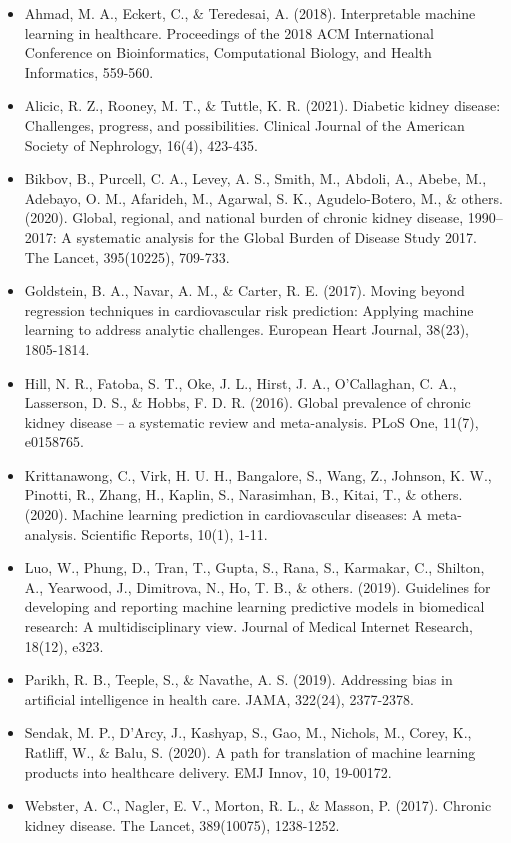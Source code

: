 \documentclass{article}
\begin{document}
\begin{itemize}
    \item Ahmad, M. A., Eckert, C., \& Teredesai, A. (2018). Interpretable machine learning in healthcare. Proceedings of the 2018 ACM International Conference on Bioinformatics, Computational Biology, and Health Informatics, 559-560.
    \item Alicic, R. Z., Rooney, M. T., \& Tuttle, K. R. (2021). Diabetic kidney disease: Challenges, progress, and possibilities. Clinical Journal of the American Society of Nephrology, 16(4), 423-435.
    \item Bikbov, B., Purcell, C. A., Levey, A. S., Smith, M., Abdoli, A., Abebe, M., Adebayo, O. M., Afarideh, M., Agarwal, S. K., Agudelo-Botero, M., \& others. (2020). Global, regional, and national burden of chronic kidney disease, 1990–2017: A systematic analysis for the Global Burden of Disease Study 2017. The Lancet, 395(10225), 709-733.
    \item Goldstein, B. A., Navar, A. M., \& Carter, R. E. (2017). Moving beyond regression techniques in cardiovascular risk prediction: Applying machine learning to address analytic challenges. European Heart Journal, 38(23), 1805-1814.
    \item Hill, N. R., Fatoba, S. T., Oke, J. L., Hirst, J. A., O'Callaghan, C. A., Lasserson, D. S., \& Hobbs, F. D. R. (2016). Global prevalence of chronic kidney disease – a systematic review and meta-analysis. PLoS One, 11(7), e0158765.
    \item Krittanawong, C., Virk, H. U. H., Bangalore, S., Wang, Z., Johnson, K. W., Pinotti, R., Zhang, H., Kaplin, S., Narasimhan, B., Kitai, T., \& others. (2020). Machine learning prediction in cardiovascular diseases: A meta-analysis. Scientific Reports, 10(1), 1-11.
    \item Luo, W., Phung, D., Tran, T., Gupta, S., Rana, S., Karmakar, C., Shilton, A., Yearwood, J., Dimitrova, N., Ho, T. B., \& others. (2019). Guidelines for developing and reporting machine learning predictive models in biomedical research: A multidisciplinary view. Journal of Medical Internet Research, 18(12), e323.
    \item Parikh, R. B., Teeple, S., \& Navathe, A. S. (2019). Addressing bias in artificial intelligence in health care. JAMA, 322(24), 2377-2378.
    \item Sendak, M. P., D'Arcy, J., Kashyap, S., Gao, M., Nichols, M., Corey, K., Ratliff, W., \& Balu, S. (2020). A path for translation of machine learning products into healthcare delivery. EMJ Innov, 10, 19-00172.
    \item Webster, A. C., Nagler, E. V., Morton, R. L., \& Masson, P. (2017). Chronic kidney disease. The Lancet, 389(10075), 1238-1252.
\end{itemize}
\newpage
\end{document}
